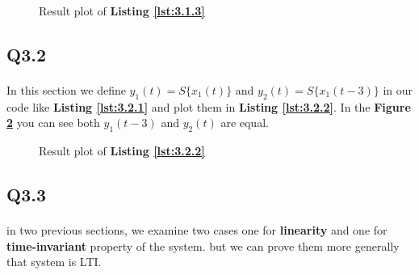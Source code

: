 \vspace{2ex}
  
  
  \begin{figure}[H]
    \resizebox{\textwidth}{!}{}
    \caption{Result plot of \textbf{Listing \ref{lst:3.1.3}}}
    \label{fig:q3.1}
\end{figure}

\subsection{Q3.2}
\paragraph{}In this section we define $y_1(t)=S\{x_1(t)\}$ and 
$y_2(t)=S\{x_1(t-3)\}$ in our code like \textbf{Listing \ref{lst:3.2.1}} and
plot them in \textbf{Listing \ref{lst:3.2.2}}. In the \textbf{Figure \ref{fig:q3.2}}
you can see both $y_1(t-3)$ and $y_2(t)$ are equal.

\vspace{2ex}

  \vspace{2ex}

  \begin{figure}[H]
    \resizebox{\textwidth}{!}{}
    \caption{Result plot of \textbf{Listing \ref{lst:3.2.2}}}
    \label{fig:q3.2}
\end{figure}

\subsection{Q3.3}
\paragraph{} in two previous sections, we examine two cases one for \textbf{linearity}
and one for \textbf{time-invariant} property of the system. but we can prove them more
generally that system is LTI.


